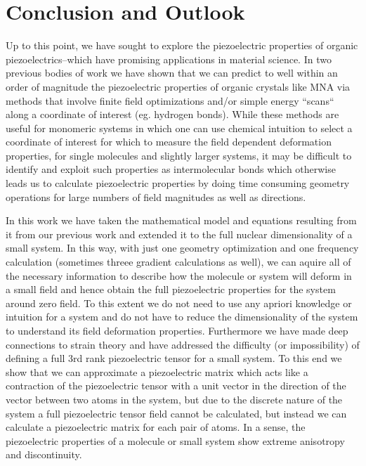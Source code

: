 

\section{Conclusion and Outlook}
Up to this point, we have sought to explore the piezoelectric properties of organic piezoelectrics--which have promising applications in material science.
In two previous bodies of work we have shown that we can predict to well within an order of magnitude the piezoelectric properties of organic crystals like MNA
via methods that involve finite field optimizations and/or simple energy ``scans`` along a coordinate of interest (eg. hydrogen bonds).
While these methods are useful for monomeric systems in which one can use chemical intuition to select a coordinate of interest for which to measure the field dependent 
deformation properties, for single molecules and slightly larger systems, it may be difficult to identify and exploit such properties as intermolecular bonds which
otherwise leads us to calculate piezoelectric properties by doing time consuming geometry operations for large numbers of field magnitudes as well as directions.

In this work we have taken the mathematical model and equations resulting from it from our previous work and extended it to the full nuclear dimensionality of 
a small system.  
In this way, with just one geometry optimization and one frequency calculation (sometimes threee gradient calculations as well), we can aquire all of the necessary information
to describe how the molecule or system will deform in a small field and hence obtain the full piezoelectric properties for the system around zero field.
To this extent we do not need to use any apriori knowledge or intuition for a system and do not have to reduce the dimensionality of the system to understand its
field deformation properties.
Furthermore we have made deep connections to strain theory and have addressed the difficulty (or impossibility) of defining a full 3rd rank piezoelectric tensor for a small
system.  
To this end we show that we can approximate a piezoelectric matrix which acts like a contraction of the piezoelectric tensor with a unit vector in the direction of the vector between 
two atoms in the system, but due to the discrete nature of the system a full piezoelectric tensor field cannot be calculated, but instead we can calculate a piezoelectric matrix for each pair of atoms.
In a sense, the piezoelectric properties of a molecule or small system show extreme anisotropy and discontinuity.

